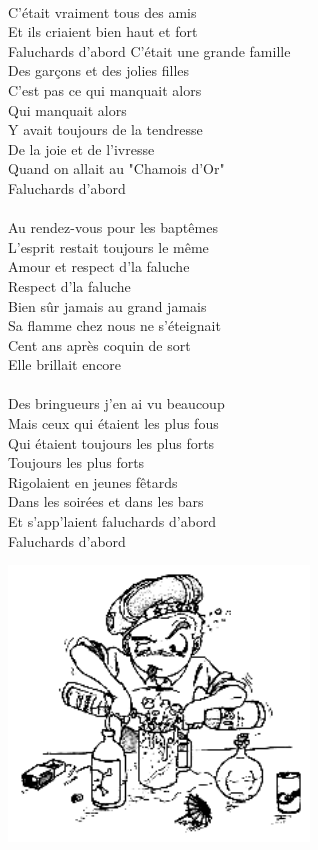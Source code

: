 \\C'était vraiment tous des amis
\\Et ils criaient bien haut et fort
\\Faluchards d'abord
\breakpage
C'était une grande famille
\\Des garçons et des jolies filles
\\C'est pas ce qui manquait alors
\\Qui manquait alors
\\Y avait toujours de la tendresse
\\De la joie et de l'ivresse
\\Quand on allait au "Chamois d'Or"
\\Faluchards d'abord
\\\\Au rendez-vous pour les baptêmes
\\L'esprit restait toujours le même
\\Amour et respect d'la faluche
\\Respect d'la faluche
\\Bien sûr jamais au grand jamais
\\Sa flamme chez nous ne s'éteignait
\\Cent ans après coquin de sort
\\Elle brillait encore
\\\\Des bringueurs j'en ai vu beaucoup
\\Mais ceux qui étaient les plus fous
\\Qui étaient toujours les plus forts
\\Toujours les plus forts
\\Rigolaient en jeunes fêtards
\\Dans les soirées et dans les bars
\\Et s'app'laient faluchards d'abord
\\Faluchards d'abord
\begin{center}
\includegraphics[width=0.6\textwidth]{images/faluchard.png}
\end{center}

\breakpage